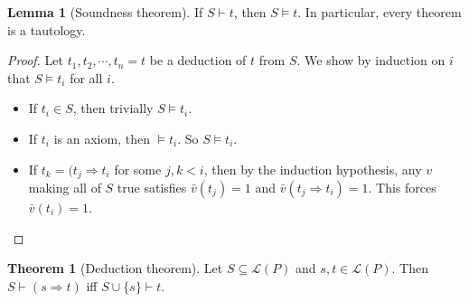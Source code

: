 \documentclass[a4paper]{article}
\theoremstyle{definition}
\newtheorem*{thm}{Theorem}
\newtheorem*{lemma}{Lemma}
\newcommand{\La}{\mathcal{L}}
\begin{document}
\begin{lemma}[Soundness theorem]
  If $S\vdash t$, then $S\models t$. In particular, every theorem is a tautology.
\end{lemma}

\begin{proof}
  Let $t_1, t_2, \cdots, t_n = t$ be a deduction of $t$ from $S$. We show by induction on $i$ that $S\models t_i$ for all $i$.
  \begin{itemize}
  \item If $t_i\in S$, then trivially $S\models t_i$.
  \item If $t_i$ is an axiom, then $\models t_i$. So $S\models t_i$.
  \item If $t_k = (t_j\Rightarrow t_i$ for some $j, k < i$, then by the induction hypothesis, any $v$ making all of $S$ true satisfies $\bar v(t_j) = 1$ and $\bar v(t_j\Rightarrow t_i) = 1$. This forces $\bar v(t_i) = 1$.
  \end{itemize}
\end{proof}

\begin{thm}[Deduction theorem]
  Let $S\subseteq \La(P)$ and $s, t\in \La(P)$. Then  $S\vdash (s\Rightarrow t)$ iff $S\cup \{s\}\vdash t$.
\end{thm}
\end{document}
